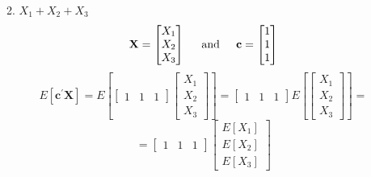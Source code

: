 \begin{enumerate}[font=\bfseries]
\begin{enumerate}
\[            \]
            \item $X_1 + X_2 + X_3$
            \[
                \textbf{X}
                =
                \begin{bmatrix}
                    X_1 \\
                    X_2 \\
                    X_3
                \end{bmatrix}
                \hspace{0.2in}\text{and}\hspace{0.2in}
                \textbf{c}
                =
                \begin{bmatrix}
                    1 \\
                    1 \\
                    1
                \end{bmatrix}
            \]
            \[
                E\left[\textbf{c}^\prime\textbf{X}\right]
                =
                E\left[
                \begin{bmatrix}
                    1 & 1 & 1
                \end{bmatrix}
                    \begin{bmatrix}
                    X_1 \\
                    X_2 \\
                    X_3
                \end{bmatrix}
                \right]
                =
                \begin{bmatrix}
                    1 & 1 & 1
                \end{bmatrix}                
                E\left[
                \begin{bmatrix}
                    X_1 \\
                    X_2 \\
                    X_3
                \end{bmatrix}
                \right]
                =
            \]
            \[
                =
                \begin{bmatrix}
                    1 & 1 & 1
                \end{bmatrix}                
                \begin{bmatrix}
                    E\left[X_1\right] \\
                    E\left[X_2\right] \\
                    E\left[X_3\right]

\end{bmatrix}\]
\end{enumerate}
\end{enumerate}

